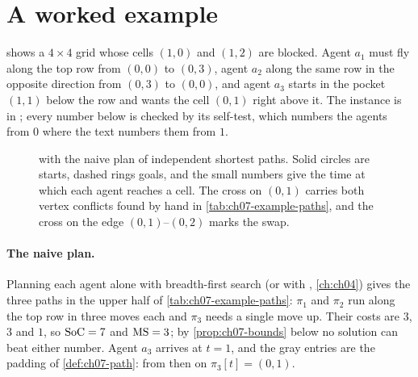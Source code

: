 \section{A worked example}
\label{sec:ch07-example}

\begin{example}
\label{ex:ch07-grid}
 shows a $4 \times 4$ grid whose cells
$(1,0)$ and $(1,2)$ are blocked. Agent $a_1$ must fly along the top row from
$(0,0)$ to $(0,3)$, agent $a_2$ along the same row in the opposite direction
from $(0,3)$ to $(0,0)$, and agent $a_3$ starts in the pocket $(1,1)$ below
the row and wants the cell $(0,1)$ right above it. The instance is
 in ; every number below is
checked by its self-test, which numbers the agents from $0$ where the text
numbers them from $1$.
\end{example}

\begin{figure}[!htb]
  \centering
  \caption{ with the naive plan of independent shortest
  paths. Solid circles are starts, dashed rings goals, and the small numbers
  give the time at which each agent reaches a cell. The cross on $(0,1)$
  carries both vertex conflicts found by hand in
  \cref{tab:ch07-example-paths}, and the cross on the edge $(0,1)$--$(0,2)$
  marks the swap.}
  \label{fig:ch07-example-instance}
\end{figure}

\paragraph{The naive plan.}
Planning each agent alone with breadth-first search (or with \astar,
\cref{ch:ch04}) gives the three paths in the upper half of
\cref{tab:ch07-example-paths}: $\pi_1$ and $\pi_2$ run along the top row in
three moves each and $\pi_3$ needs a single move up. Their costs are $3$,
$3$ and $1$, so $\mathrm{SoC} = 7$ and $\mathrm{MS} = 3$; by \cref{prop:ch07-bounds}
below no solution can beat either number. Agent $a_3$ arrives at $t = 1$, and
the gray entries are the padding of \cref{def:ch07-path}: from then on
$\pi_3[t] = (0,1)$.

